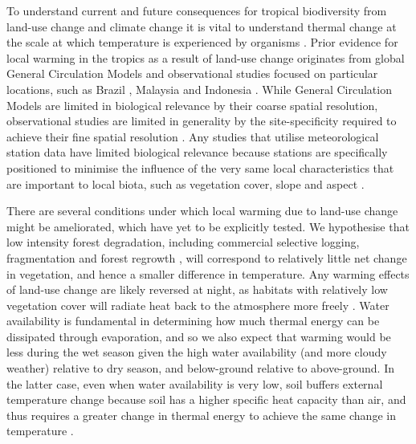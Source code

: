 \documentclass[12pt,a4paper,]{report}
\theoremstyle{definition}
\theoremstyle{definition}
\theoremstyle{definition}
\theoremstyle{remark}
\begin{document}
To understand current and future consequences for tropical biodiversity
from land-use change and climate change it is vital to understand
thermal change at the scale at which temperature is experienced by
organisms
\citep{wiens_matching2010, gillingham_relative2010, suggitt_habitat2011}.
Prior evidence for local warming in the tropics as a result of land-use
change originates from global General Circulation Models
\citep{findell_modeled2007, davin_climatic2010, pielke_land2011} and
observational studies focused on particular locations, such as Brazil
\citep{loarie_velocity2009}, Malaysia \citep{luskin_microclimate2011}
and Indonesia \citep{ramdani_local2014}. While General Circulation
Models are limited in biological relevance by their coarse spatial
resolution, observational studies are limited in generality by the
site-specificity required to achieve their fine spatial resolution
\citep{li_local2015}. Any studies that utilise meteorological station
data have limited biological relevance because stations are specifically
positioned to minimise the influence of the very same local
characteristics that are important to local biota, such as vegetation
cover, slope and aspect \citep{frenne_weather2016}.

There are several conditions under which local warming due to land-use
change might be ameliorated, which have yet to be explicitly tested. We
hypothesise that low intensity forest degradation, including commercial
selective logging, fragmentation and forest regrowth
\citep{lewis_increasing2015}, will correspond to relatively little net
change in vegetation, and hence a smaller difference in temperature. Any
warming effects of land-use change are likely reversed at night, as
habitats with relatively low vegetation cover will radiate heat back to
the atmosphere more freely
\citep{oke_boundary1987, chen_growing-season1995}. Water availability is
fundamental in determining how much thermal energy can be dissipated
through evaporation, and so we also expect that warming would be less
during the wet season given the high water availability (and more cloudy
weather) relative to dry season, and below-ground relative to
above-ground. In the latter case, even when water availability is very
low, soil buffers external temperature change
\citep{scheffers_microhabitats2014-1} because soil has a higher specific
heat capacity than air, and thus requires a greater change in thermal
energy to achieve the same change in temperature
\citep{oke_boundary1987}.
\end{document}
